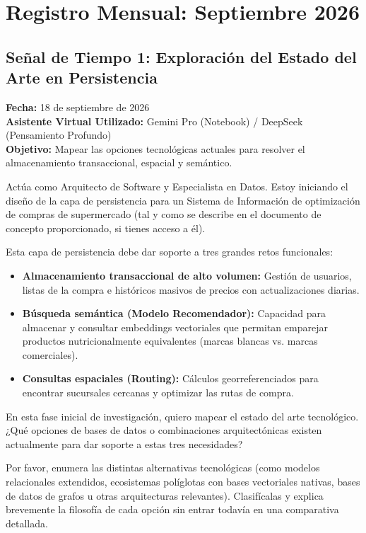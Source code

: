 \section{Registro Mensual: Septiembre 2026}

\subsection{Señal de Tiempo 1: Exploración del Estado del Arte en Persistencia}
\textbf{Fecha:} 18 de septiembre de 2026 \\
\textbf{Asistente Virtual Utilizado:} Gemini Pro (Notebook) / DeepSeek (Pensamiento Profundo) \\
\textbf{Objetivo:} Mapear las opciones tecnológicas actuales para resolver el almacenamiento transaccional, espacial y semántico.

\begin{tcolorbox}[colback=promptcolor, title=Prompt Introducido, colframe=blue!50!black, breakable]
	Actúa como Arquitecto de Software y Especialista en Datos. Estoy iniciando el diseño de la capa de persistencia para un Sistema de Información de optimización de compras de supermercado (tal y como se describe en el documento de concepto proporcionado, si tienes acceso a él).
	
	Esta capa de persistencia debe dar soporte a tres grandes retos funcionales:
	\begin{itemize}
		\item \textbf{Almacenamiento transaccional de alto volumen:} Gestión de usuarios, listas de la compra e históricos masivos de precios con actualizaciones diarias.
		\item \textbf{Búsqueda semántica (Modelo Recomendador):} Capacidad para almacenar y consultar embeddings vectoriales que permitan emparejar productos nutricionalmente equivalentes (marcas blancas vs. marcas comerciales).
		\item \textbf{Consultas espaciales (Routing):} Cálculos georreferenciados para encontrar sucursales cercanas y optimizar las rutas de compra.
	\end{itemize}
	
	En esta fase inicial de investigación, quiero mapear el estado del arte tecnológico. ¿Qué opciones de bases de datos o combinaciones arquitectónicas existen actualmente para dar soporte a estas tres necesidades?
	
	Por favor, enumera las distintas alternativas tecnológicas (como modelos relacionales extendidos, ecosistemas políglotas con bases vectoriales nativas, bases de datos de grafos u otras arquitecturas relevantes). Clasifícalas y explica brevemente la filosofía de cada opción sin entrar todavía en una comparativa detallada.
\end{tcolorbox}


